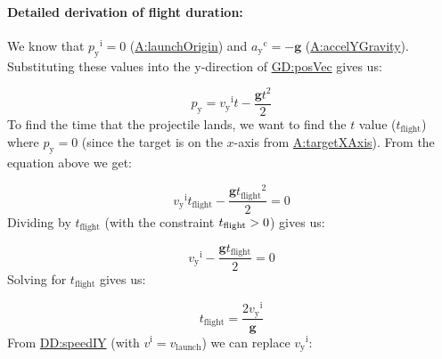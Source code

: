 \documentclass[12pt]{article}
\newcommand{\gt}{\ensuremath >}
\begin{document}
\paragraph{Detailed derivation of flight duration:}
\label{IM:calOfLandingTimeDeriv}
We know that ${{p_{\text{y}}}^{\text{i}}}=0$ (\hyperref[launchOrigin]{A:launchOrigin}) and ${{a_{\text{y}}}^{\text{c}}}=-\symbf{g}$ (\hyperref[accelYGravity]{A:accelYGravity}). Substituting these values into the y-direction of \hyperref[GD:posVec]{GD:posVec} gives us:

\begin{displaymath}
{p_{\text{y}}}={{v_{\text{y}}}^{\text{i}}} t-\frac{\symbf{g} t^{2}}{2}
\end{displaymath}
To find the time that the projectile lands, we want to find the $t$ value (${t_{\text{flight}}}$) where ${p_{\text{y}}}=0$ (since the target is on the $x$-axis from \hyperref[targetXAxis]{A:targetXAxis}). From the equation above we get:

\begin{displaymath}
{{v_{\text{y}}}^{\text{i}}} {t_{\text{flight}}}-\frac{\symbf{g} {t_{\text{flight}}}^{2}}{2}=0
\end{displaymath}
Dividing by ${t_{\text{flight}}}$ (with the constraint ${t_{\text{flight}}}\gt{}0$) gives us:

\begin{displaymath}
{{v_{\text{y}}}^{\text{i}}}-\frac{\symbf{g} {t_{\text{flight}}}}{2}=0
\end{displaymath}
Solving for ${t_{\text{flight}}}$ gives us:

\begin{displaymath}
{t_{\text{flight}}}=\frac{2 {{v_{\text{y}}}^{\text{i}}}}{\symbf{g}}
\end{displaymath}
From \hyperref[DD:speedIY]{DD:speedIY} (with ${v^{\text{i}}}={v_{\text{launch}}}$) we can replace ${{v_{\text{y}}}^{\text{i}}}$:
\end{document}
